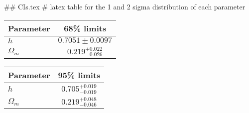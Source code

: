 ## CIs.tex
# latex table for the 1 and 2 sigma distribution of each parameter

\begin{tabular} { l  c}
 Parameter &  68\% limits\\
\hline
{\boldmath$h              $} & $0.7051\pm 0.0097          $\\
{\boldmath$\Omega_m       $} & $0.219^{+0.022}_{-0.026}   $\\
\hline
\end{tabular}

\begin{tabular} { l  c}
 Parameter &  95\% limits\\
\hline
{\boldmath$h              $} & $0.705^{+0.019}_{-0.019}   $\\
{\boldmath$\Omega_m       $} & $0.219^{+0.048}_{-0.046}   $\\
\hline
\end{tabular}
